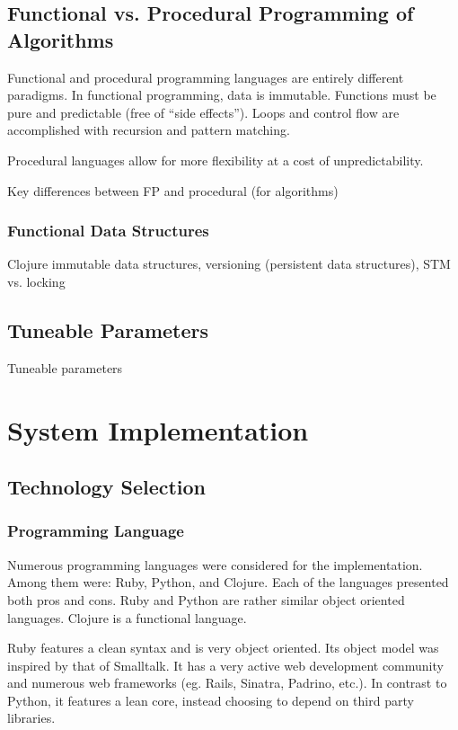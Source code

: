 \documentclass[12pt,letterpaper,oneside,notitlepage]{report}
\theoremstyle{definition}
\begin{document}
		\section{Functional vs. Procedural Programming of Algorithms}
			Functional and procedural programming languages are entirely different paradigms.	In functional programming, data is immutable.  Functions must be pure and predictable (free of ``side effects'').  Loops and control flow are accomplished with recursion and pattern matching.
			
			Procedural languages allow for more flexibility at a cost of unpredictability.  
			
			Key differences between FP and procedural (for algorithms)
			
			\subsection{Functional Data Structures}
				Clojure immutable data structures, versioning (persistent data structures), STM vs. locking
			
		\section{Tuneable Parameters}
			Tuneable parameters
	
	\chapter{System Implementation}
		\section{Technology Selection}
			
			
			\subsection{Programming Language}
				Numerous programming languages were considered for the implementation.  Among them were:  Ruby, Python, and Clojure.  Each of the languages presented both pros and cons.  Ruby and Python are rather similar object oriented languages.  Clojure is a functional language.
				
				Ruby features a clean syntax and is very object oriented.  Its object model was inspired by that of Smalltalk.  It has a very active web development community and numerous web frameworks (eg. Rails, Sinatra, Padrino, etc.).  In contrast to Python, it features a lean core, instead choosing to depend on third party libraries.
				
\end{document}
